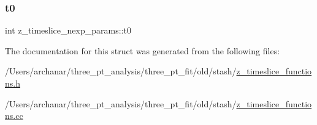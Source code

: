 \mbox{\label{structz__timeslice__nexp__params_ae1599f0639036212a58dd1a09fbc5edf}} 
\subsubsection{\texorpdfstring{t0}{t0}}
{\footnotesize\ttfamily int z\+\_\+timeslice\+\_\+nexp\+\_\+params\+::t0}



The documentation for this struct was generated from the following files\+:\begin{DoxyCompactItemize}
\item 
/\+Users/archanar/three\+\_\+pt\+\_\+analysis/three\+\_\+pt\+\_\+fit/old/stash/\mbox{\hyperlink{old_2stash_2z__timeslice__functions_8h}{z\+\_\+timeslice\+\_\+functions.\+h}}\item 
/\+Users/archanar/three\+\_\+pt\+\_\+analysis/three\+\_\+pt\+\_\+fit/old/stash/\mbox{\hyperlink{old_2stash_2z__timeslice__functions_8cc}{z\+\_\+timeslice\+\_\+functions.\+cc}}\end{DoxyCompactItemize}
